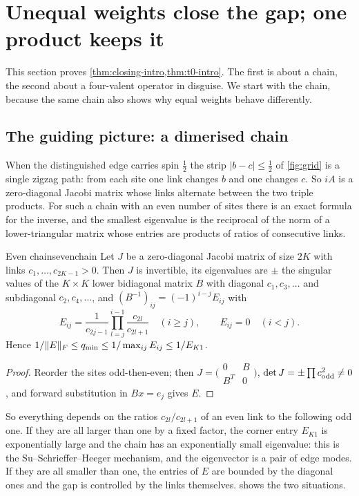 \section{Unequal weights close the gap; one product keeps it}\label{sec:closing}

This section proves \cref{thm:closing-intro,thm:t0-intro}. The first is about a
chain, the second about a four-valent operator in disguise. We start with the chain,
because the same chain also shows why equal weights behave differently.

\subsection{The guiding picture: a dimerised chain}

When the distinguished edge carries spin $\frac12$ the strip $|b-c|\le\frac12$ of
\cref{fig:grid} is a single zigzag path: from each site one link changes $b$ and one
changes $c$. So $iA$ is a zero-diagonal Jacobi matrix whose links alternate between
the two triple products. For such a chain with an even number of sites there is an
exact formula for the inverse, and the smallest eigenvalue is the reciprocal of the
norm of a lower-triangular matrix whose entries are products of ratios of
consecutive links.

\begin{boxedlemma}{Even chains}{evenchain}
Let $J$ be a zero-diagonal Jacobi matrix of size $2K$ with links $c_1,\dots,c_{2K-1}>0$.
Then $J$ is invertible, its eigenvalues are $\pm$ the singular values of the
$K\times K$ lower bidiagonal matrix $B$ with diagonal $c_1,c_3,\dots$ and subdiagonal
$c_2,c_4,\dots$, and $(B^{-1})_{ij}=(-1)^{i-j}E_{ij}$ with
\[
  E_{ij}=\frac1{c_{2j-1}}\prod_{l=j}^{i-1}\frac{c_{2l}}{c_{2l+1}}\quad(i\ge j),\qquad E_{ij}=0\quad(i<j).
\]
Hence $1/\|E\|_F\le q_{\min}\le1/\max_{ij}E_{ij}\le1/E_{K1}$.
\end{boxedlemma}

\begin{proof}
Reorder the sites odd-then-even; then $J=\bigl(\begin{smallmatrix}0&B\\B^T&0\end{smallmatrix}\bigr)$,
$\det J=\pm\prod c_{\rm odd}^2\ne0$, and forward substitution in $Bx=e_j$ gives $E$.
\end{proof}

So everything depends on the ratios $c_{2l}/c_{2l+1}$ of an even link to the
following odd one. If they are all larger than one by a fixed factor, the corner
entry $E_{K1}$ is exponentially large and the chain has an exponentially small
eigenvalue: this is the Su--Schrieffer--Heeger mechanism, and the eigenvector is a
pair of edge modes. If they are all smaller than one, the entries of $E$ are bounded
by the diagonal ones and the gap is controlled by the links themselves.
 shows the two situations.

